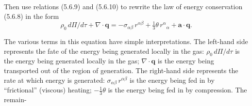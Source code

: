 Then use relations (5.6.9) and (5.6.10) to rewrite the law of energy conservation
(5.6.8) in the form
\begin{equation}
\rho_0\, d\Pi/d\tau + \nabla \cdot \mathbf{q}
= -\sigma_{\alpha\beta}\,r^{\alpha\beta}
+ \tfrac{1}{3}\theta\, r^\alpha{}_\alpha
+ \mathbf{a} \cdot \mathbf{q}.
\tag{5.6.11}
\end{equation}

The various terms in this equation have simple interpretations.  The left-hand side
represents the fate of the energy being generated locally in the gas: $\rho_0\, d\Pi/d\tau$ is
the energy being generated locally in the gas; $\nabla \cdot \mathbf{q}$ is the energy being transported out
of the region of generation.  The right-hand side represents the rate at which
energy is generated: $\sigma_{\alpha\beta}\,r^{\alpha\beta}$ is the energy being fed in by ``frictional''
(viscous) heating; $-\tfrac{1}{3}\theta$ is the energy being fed in by compression.  The remain-
